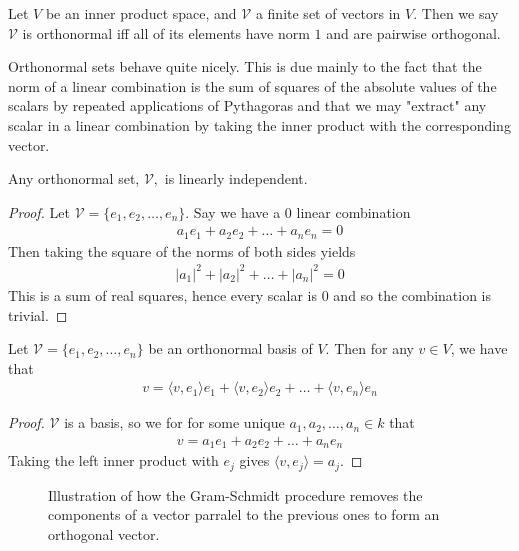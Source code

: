 \documentclass[]{article}
\begin{document}
\begin{defi} 
		Let $V$ be an inner product space, and $\mathcal{V}$ a finite set of vectors in $V$. Then we say $\mathcal{V}$ is orthonormal iff all of its elements have norm $1$ and are pairwise orthogonal.
\end{defi}

Orthonormal sets behave quite nicely. This is due mainly to the fact that the norm of a linear combination is the sum of squares of the absolute values of the scalars by repeated applications of Pythagoras and that we may "extract" any scalar in a linear combination by taking the inner product with the corresponding vector.

\begin{thm}
		Any orthonormal set, $\mathcal{V},$ is linearly independent.
\end{thm}

\begin{proof}
		Let $\mathcal{V} = \{e_1, e_2, \ldots, e_n\}$. Say we have a $0$ linear combination 
		\begin{align*}
			a_1 e_1 + a_2 e_2 + \ldots + a_n e_n = 0	
		\end{align*}
		Then taking the square of the norms of both sides yields
		\begin{align*}
				|a_1|^2 + |a_2|^2 + \ldots + |a_n|^2 = 0
		\end{align*}
		This is a sum of real squares, hence every scalar is $0$ and so the combination is trivial.
\end{proof}

\begin{thm}
		Let $\mathcal{V} = \{e_1, e_2, \ldots, e_n\}$ be an orthonormal basis of $V$. Then for any $v \in V$, we have that 
		\begin{align*}
				v = \langle v, e_1 \rangle e_1 + \langle v, e_2 \rangle e_2 + \ldots + \langle v, e_n \rangle e_n
		\end{align*}
\end{thm}

\begin{proof}
		$\mathcal{V}$ is a basis, so we for for some unique $a_1, a_2, \ldots, a_n \in k$ that
		\begin{align*}
				v = a_1 e_1 + a_2 e_2 + \ldots + a_n e_n
		\end{align*}
		Taking the left inner product with $e_j$ gives $\langle v, e_j \rangle = a_j$. 
\end{proof}

\begin{figure}[ht]
\centering
{}
\caption{Illustration of how the Gram-Schmidt procedure removes the components of a vector parralel to the previous ones to form an orthogonal vector.}
\label{fig:gram-schmidt}
\end{figure}
		
\end{document}
